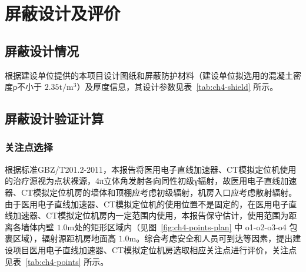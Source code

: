 





\section{屏蔽设计及评价}

\subsection{屏蔽设计情况}

根据建设单位提供的本项目设计图纸和屏蔽防护材料（建设单位拟选用的混凝土密度ρ不小于 $2 . 3 5 \mathrm { t } / \mathrm { m } ^ { 3 }$）及厚度信息，其设计参数见表~\ref{tab:ch4-shield} 所示。





\subsection{屏蔽设计验证计算}

\subsubsection{关注点选择}

根据标准GBZ/T201.2-2011，本报告将医用电子直线加速器、CT模拟定位机使用的治疗源视为点状裸源，4π立体角发射各向同性初级γ辐射，故医用电子直线加速器、CT模拟定位机房的墙体和顶棚应考虑初级辐射，机房入口应考虑散射辐射。由于医用电子直线加速器、CT模拟定位机的使用位置不是固定的，在医用电子直线加速器、CT模拟定位机房内一定范围内使用，本报告保守估计，使用范围为距离各墙体内壁 $1 . 0 \mathrm { m }$处的矩形区域内（见图~\ref{fig:ch4-points-plan} 中 o1-o2-o3-o4 包裹区域），辐射源距机房地面高 $1 . 0 \mathrm { m }$。综合考虑安全和人员可到达等因素，提出建设项目医用电子直线加速器、CT模拟定位机房选取相应关注点进行评价，关注点见表~\ref{tab:ch4-points} 所示。


